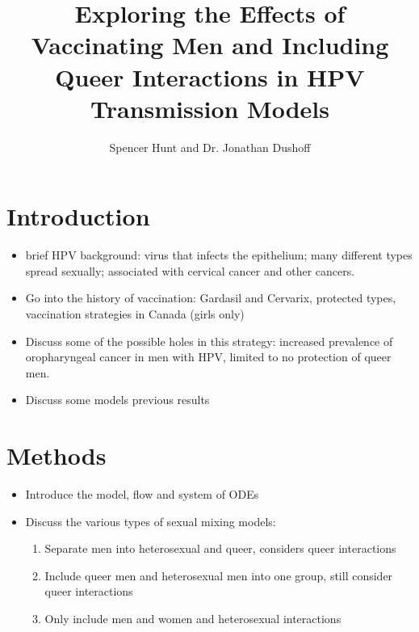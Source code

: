 \documentclass[12pt]{article}
\title{Exploring the Effects of Vaccinating Men and Including Queer Interactions in HPV Transmission Models}
\author{Spencer Hunt and Dr. Jonathan Dushoff}
\begin{document}
\maketitle

\section{Introduction}
\begin{itemize}
\item brief HPV background: virus that infects the epithelium; many different types spread sexually; associated with cervical cancer and other cancers.
\item Go into the history of vaccination: Gardasil and Cervarix, protected types, vaccination strategies in Canada (girls only)
\item Discuss some of the possible holes in this strategy: increased prevalence of oropharyngeal cancer in men with HPV, limited to no protection of queer men. 
\item Discuss some models previous results
\end{itemize}

\section{Methods}
\begin{itemize}
\item Introduce the model, flow and system of ODEs
\item Discuss the various types of sexual mixing models:
	\begin{enumerate}
	\item Separate men into heterosexual and queer, considers queer interactions
	\item Include queer men and heterosexual men into one group, still consider queer interactions 
	\item Only include men and women and heterosexual interactions
	\end{enumerate}	
\end{itemize}
\end{document}
